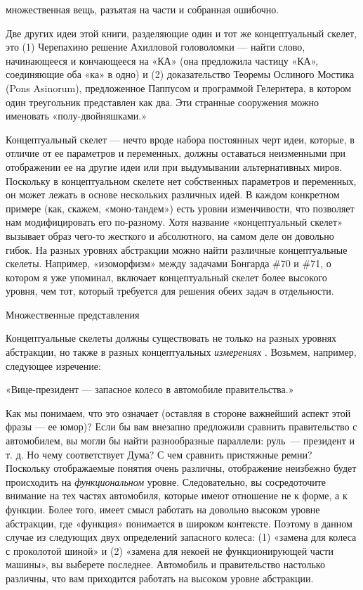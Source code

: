 \documentclass[../main.tex]{subfiles}
\begin{document}
множественная вещь, разъятая на части и собранная ошибочно.

Две других идеи этой книги, разделяющие один и тот же концептуальный скелет, это (1) Черепахино решение Ахилловой головоломки --- найти слово, начинающееся и кончающееся на «КА» (она предложила частицу «КА», соединяющие оба «ка» в одно) и (2) доказательство Теоремы Ослиного Мостика (Pons Asinorum), предложенное Паппусом и программой Гелернтера, в котором один треугольник представлен как два. Эти странные сооружения можно именовать «полу-двойняшками.»

Концептуальный скелет --- нечто вроде набора постоянных черт идеи, которые, в отличие от ее параметров и переменных, должны оставаться неизменными при отображении ее на другие идеи или при выдумывании альтернативных миров. Поскольку в концептуальном скелете нет собственных параметров и переменных, он может лежать в основе нескольких различных идей. В каждом конкретном примере (как, скажем, «моно-тандем») есть уровни изменчивости, что позволяет нам модифицировать его по-разному. Хотя название «концептуальный скелет» вызывает образ чего-то жесткого и абсолютного, на самом деле он довольно гибок. На разных уровнях абстракции можно найти различные концептуальные скелеты. Например, «изоморфизм» между задачами Бонгарда \#70 и \#71, о котором я уже упоминал, включает концептуальный скелет более высокого уровня, чем тот, который требуется для решения обеих задач в отдельности.

Множественные представления

Концептуальные скелеты должны существовать не только на разных уровнях абстракции, но также в разных концептуальных \emph{измерениях} . Возьмем, например, следующее изречение:

«Вице-президент --- запасное колесо в автомобиле правительства.»

Как мы понимаем, что это означает (оставляя в стороне важнейший аспект этой фразы --- ее юмор)? Если бы вам внезапно предложили сравнить правительство с автомобилем, вы могли бы найти разнообразные параллели: руль~--- президент и т. д. Но чему соответствует Дума? С чем сравнить пристяжные ремни? Поскольку отображаемые понятия очень различны, отображение неизбежно будет происходить на \emph{функциональном} уровне. Следовательно, вы сосредоточите внимание на тех частях автомобиля, которые имеют отношение не к форме, а к функции. Более того, имеет смысл работать на довольно высоком уровне абстракции, где «функция» понимается в широком контексте. Поэтому в данном случае из следующих двух определений запасного колеса: (1) «замена для колеса с проколотой шиной» и (2) «замена для некоей не функционирующей части машины», вы выберете последнее. Автомобиль и правительство настолько различны, что вам приходится работать на высоком уровне абстракции.
\end{document}
